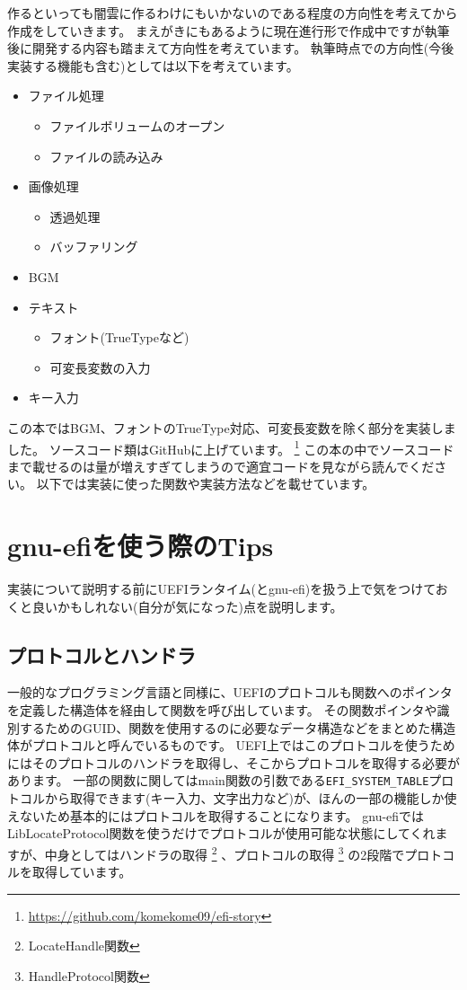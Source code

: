 \documentclass[10pt,b5paper,twoside,openany]{ltjsbook}
\begin{document}
作るといっても闇雲に作るわけにもいかないのである程度の方向性を考えてから作成をしていきます。
まえがきにもあるように現在進行形で作成中ですが執筆後に開発する内容も踏まえて方向性を考えています。
執筆時点での方向性(今後実装する機能も含む)としては以下を考えています。
\begin{multicols}{2}
    \centering
    \begin{itemize}
        \item ファイル処理
        \begin{itemize}
            \item ファイルボリュームのオープン
            \item ファイルの読み込み
        \end{itemize}
        \item 画像処理
        \begin{itemize}
            \item 透過処理
            \item バッファリング
        \end{itemize}
        \item BGM
        \columnbreak
        \item テキスト
        \begin{itemize}
            \item フォント(TrueTypeなど)
            \item 可変長変数の入力
        \end{itemize}
        \item キー入力
    \end{itemize}
\end{multicols}
この本ではBGM、フォントのTrueType対応、可変長変数を除く部分を実装しました。
ソースコード類はGitHubに上げています。
\footnote{\url{https://github.com/komekome09/efi-story}}
この本の中でソースコードまで載せるのは量が増えすぎてしまうので適宜コードを見ながら読んでください。
以下では実装に使った関数や実装方法などを載せています。

\section{gnu-efiを使う際のTips}
実装について説明する前にUEFIランタイム(とgnu-efi)を扱う上で気をつけておくと良いかもしれない(自分が気になった)点を説明します。
\subsection{プロトコルとハンドラ}
一般的なプログラミング言語と同様に、UEFIのプロトコルも関数へのポインタを定義した構造体を経由して関数を呼び出しています。
その関数ポインタや識別するためのGUID、関数を使用するのに必要なデータ構造などをまとめた構造体がプロトコルと呼んでいるものです。
UEFI上ではこのプロトコルを使うためにはそのプロトコルのハンドラを取得し、そこからプロトコルを取得する必要があります。
一部の関数に関してはmain関数の引数である\verb+EFI_SYSTEM_TABLE+プロトコルから取得できます(キー入力、文字出力など)が、ほんの一部の機能しか使えないため基本的にはプロトコルを取得することになります。
gnu-efiではLibLocateProtocol関数を使うだけでプロトコルが使用可能な状態にしてくれますが、中身としてはハンドラの取得
\footnote{LocateHandle関数}
、プロトコルの取得
\footnote{HandleProtocol関数}
の2段階でプロトコルを取得しています。
\end{document}
